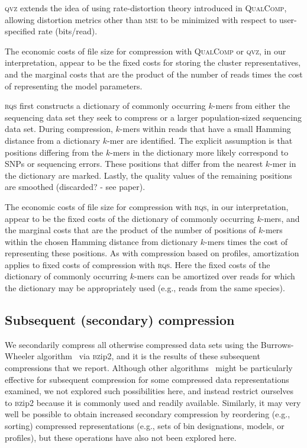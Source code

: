 \documentclass{bmcart}
\begin{document}
\textsc{qvz} extends the idea of using rate-distortion theory
introduced in \textsc{QualComp}, allowing distortion metrics other
than \textsc{mse} to be minimized with respect to user-specified rate
(bits/read).

The economic costs of file size for compression with \textsc{QualComp}
or \textsc{qvz}, in our interpretation, appear to be the fixed costs
for storing the cluster representatives, and the marginal costs that
are the product of the number of reads times the cost of representing
the model parameters.

\textsc{rqs} first constructs a dictionary of commonly occurring
$k$-mers from either the sequencing data set they seek to compress or
a larger population-sized sequencing data set. During compression,
$k$-mers within reads that have a small Hamming distance from a
dictionary $k$-mer are identified. The explicit assumption is that
positions differing from the $k$-mers in the dictionary more likely
correspond to SNPs or sequencing errors. These positions that differ
from the nearest $k$-mer in the dictionary are marked. Lastly, the
quality values of the remaining positions are smoothed (discarded? -
see paper).

The economic costs of file size for compression with \textsc{rqs}, in
our interpretation, appear to be the fixed costs of the dictionary of
commonly occurring $k$-mers, and the marginal costs that are the
product of the number of positions of $k$-mers within the chosen
Hamming distance from dictionary $k$-mers times the cost of
representing these positions. As with compression based on profiles,
amortization applies to fixed costs of compression with
\textsc{rqs}. Here the fixed costs of the dictionary of commonly
occurring $k$-mers can be amortized over reads for which the
dictionary may be appropriately used (e.g., reads from the same
species).

\subsection*{Subsequent (secondary) compression}

We secondarily compress all otherwise compressed data sets using the
Burrows-Wheeler algorithm~\cite{bwt} via \textsc{bz}ip2, and it is the
results of these subsequent compressions that we report. Although
other algorithms~\cite[e.g.,][]{HUFFMAN:1952nr,Ziv77auniversal,
  DBLP:journals/tit/ZivL78} might be particularly effective for
subsequent compression for some compressed data representations
examined, we not explored such possibilities here, and instead
restrict ourselves to \textsc{bz}ip2 because it is commonly used and
readily available. Similarly, it may very well be possible to obtain
increased secondary compression by reordering (e.g., sorting)
compressed representations (e.g., sets of bin designations, models, or
profiles), but these operations have also not been explored here.
\end{document}
